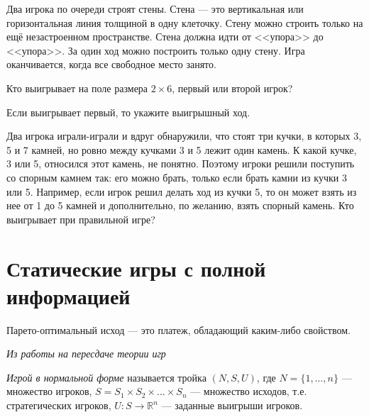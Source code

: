 \begin{problem}

Два игрока по очереди строят стены. Стена --- это вертикальная или горизонтальная линия толщиной в одну клеточку. Стену можно строить только на ещё незастроенном пространстве. Стена должна идти от <<упора>> до <<упора>>. За один ход можно построить только одну стену. Игра оканчивается, когда все свободное место занято.

Кто выигрывает на поле размера $2\times 6$, первый или второй игрок?

Если выигрывает первый, то укажите выигрышный ход.



\begin{sol}

\end{sol}
\end{problem}




\begin{problem}

Два игрока играли-играли и вдруг обнаружили, что стоят три кучки, в которых 3, 5 и 7 камней, но ровно между кучками 3 и 5 лежит один камень. К какой кучке, 3 или 5, относился этот камень, не понятно. Поэтому игроки решили поступить со спорным камнем так: его можно брать, только если брать камни из кучки 3 или 5. Например, если игрок решил делать ход из кучки 5, то он может взять из нее от 1 до 5 камней и дополнительно, по желанию, взять спорный камень. Кто выигрывает при правильной игре?



\begin{sol}

\end{sol}
\end{problem}








\section{Статические игры с полной информацией} %

Парето-оптимальный исход --- это платеж, обладающий каким-либо свойством.

{\it Из работы на пересдаче теории игр}

{\it Игрой в нормальной форме} называется тройка $ (N,S,U)$, где $N=\{1,\dots,n\}$ --- множество игроков, $S=S_1 \times S_2 \times \ldots \times S_n$ --- множество исходов, т.е. стратегических игроков, $U: S \to \mathbb{R}^n$ --- заданные выигрыши игроков. 

